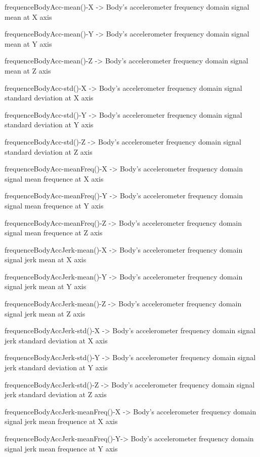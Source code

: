 \documentclass[
]{article}
\begin{document}
frequenceBodyAcc-mean()-X -\textgreater{} Body's accelerometer frequency
domain signal mean at X axis

frequenceBodyAcc-mean()-Y -\textgreater{} Body's accelerometer frequency
domain signal mean at Y axis

frequenceBodyAcc-mean()-Z -\textgreater{} Body's accelerometer frequency
domain signal mean at Z axis

frequenceBodyAcc-std()-X -\textgreater{} Body's accelerometer frequency
domain signal standard deviation at X axis

frequenceBodyAcc-std()-Y -\textgreater{} Body's accelerometer frequency
domain signal standard deviation at Y axis

frequenceBodyAcc-std()-Z -\textgreater{} Body's accelerometer frequency
domain signal standard deviation at Z axis

frequenceBodyAcc-meanFreq()-X -\textgreater{} Body's accelerometer
frequency domain signal mean frequence at X axis

frequenceBodyAcc-meanFreq()-Y -\textgreater{} Body's accelerometer
frequency domain signal mean frequence at Y axis

frequenceBodyAcc-meanFreq()-Z -\textgreater{} Body's accelerometer
frequency domain signal mean frequence at Z axis

frequenceBodyAccJerk-mean()-X -\textgreater{} Body's accelerometer
frequency domain signal jerk mean at X axis

frequenceBodyAccJerk-mean()-Y -\textgreater{} Body's accelerometer
frequency domain signal jerk mean at Y axis

frequenceBodyAccJerk-mean()-Z -\textgreater{} Body's accelerometer
frequency domain signal jerk mean at Z axis

frequenceBodyAccJerk-std()-X -\textgreater{} Body's accelerometer
frequency domain signal jerk standard deviation at X axis

frequenceBodyAccJerk-std()-Y -\textgreater{} Body's accelerometer
frequency domain signal jerk standard deviation at Y axis

frequenceBodyAccJerk-std()-Z -\textgreater{} Body's accelerometer
frequency domain signal jerk standard deviation at Z axis

frequenceBodyAccJerk-meanFreq()-X -\textgreater{} Body's accelerometer
frequency domain signal jerk mean frequence at X axis

frequenceBodyAccJerk-meanFreq()-Y-\textgreater{} Body's accelerometer
frequency domain signal jerk mean frequence at Y axis
\end{document}
